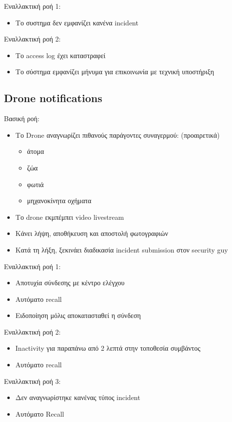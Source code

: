 \documentclass{article}
\begin{document}
\noindent Εναλλακτική ροή 1:
\begin{itemize}
    \item Το συστημα δεν εμφανίζει κανένα incident
\end{itemize}

\noindent Εναλλακτική ροή 2:
\begin{itemize}
    \item Το access log έχει καταστραφεί
    \item Το σύστημα εμφανίζει μήνυμα για επικοινωνία με τεχνική υποστήριξη
\end{itemize}

\subsection{Drone notifications}

\noindent Βασική ροή:
\begin{itemize}
    \item Το Drone αναγνωρίζει πιθανούς παράγοντες συναγερμού: (προαιρετικά)
    \begin{itemize}
        \item άτομα
        \item ζώα 
        \item φωτιά
        \item μηχανοκίνητα οχήματα
    \end{itemize}
    \item Το drone εκμπέμπει video livestream 
    \item Κάνει λήψη, αποθήκευση και αποστολή φωτογραφιών
    \item Κατά τη λήξη, ξεκινάει διαδικασία incident submission στον security guy
\end{itemize}

\noindent Εναλλακτική ροή 1:
\begin{itemize}
    \item Αποτυχία σύνδεσης με κέντρο ελέγχου
    \item Αυτόματο recall
    \item Ειδοποίηση μόλις αποκατασταθεί η σύνδεση
\end{itemize}

\noindent Εναλλακτική ροή 2:
\begin{itemize}
    \item Inactivity για παραπάνω από 2 λεπτά στην τοποθεσία συμβάντος
    \item Αυτόματο recall
\end{itemize}
\noindent Εναλλακτική ροή 3:
\begin{itemize}
    \item Δεν αναγνωρίστηκε κανένας τύπος incident
    \item Αυτόματο Recall
\end{itemize}
\end{document}
